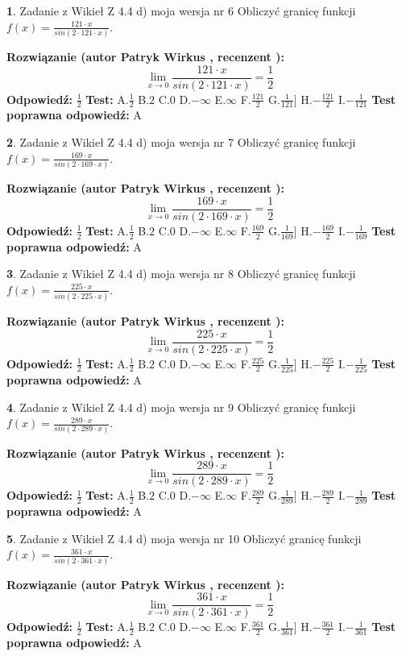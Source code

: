 \documentclass[12pt, a4paper]{article}
\theoremstyle{definition} %
\newtheorem{zad}{}
\newcommand{\zadStart}[1]{\begin{zad}#1\newline}
\newcommand{\zadStop}{\end{zad}}
\newcommand{\rozwStart}[2]{\noindent \textbf{Rozwiązanie (autor #1 , recenzent #2): }\newline}
\newcommand{\rozwStop}{\newline}
\newcommand{\odpStart}{\noindent \textbf{Odpowiedź:}\newline}
\newcommand{\odpStop}{\newline}
\newcommand{\testStart}{\noindent \textbf{Test:}\newline}
\newcommand{\testStop}{\newline}
\newcommand{\kluczStart}{\noindent \textbf{Test poprawna odpowiedź:}\newline}
\newcommand{\kluczStop}{\newline}
\begin{document}
\zadStart{Zadanie z Wikieł Z 4.4 d) moja wersja nr 6}
Obliczyć granicę funkcji $f(x)=\frac{121\cdot x}{sin(2 \cdot121\cdot x)}$.
\zadStop
\rozwStart{Patryk Wirkus}{}
$$\lim\limits_{x\to 0}\frac{121\cdot x}{sin(2 \cdot121\cdot x)}=\frac{1}{2}$$
\rozwStop
\odpStart
$\frac{1}{2}$
\odpStop
\testStart
A.$\frac{1}{2}$
B.$2$
C.$0$
D.$-\infty$
E.$\infty$
F.$\frac{121}{2}$
G.$\frac{1}{121}]$
H.$-\frac{121}{2}$
I.$-\frac{1}{121}$
\testStop
\kluczStart
A
\kluczStop



\zadStart{Zadanie z Wikieł Z 4.4 d) moja wersja nr 7}
Obliczyć granicę funkcji $f(x)=\frac{169\cdot x}{sin(2 \cdot169\cdot x)}$.
\zadStop
\rozwStart{Patryk Wirkus}{}
$$\lim\limits_{x\to 0}\frac{169\cdot x}{sin(2 \cdot169\cdot x)}=\frac{1}{2}$$
\rozwStop
\odpStart
$\frac{1}{2}$
\odpStop
\testStart
A.$\frac{1}{2}$
B.$2$
C.$0$
D.$-\infty$
E.$\infty$
F.$\frac{169}{2}$
G.$\frac{1}{169}]$
H.$-\frac{169}{2}$
I.$-\frac{1}{169}$
\testStop
\kluczStart
A
\kluczStop



\zadStart{Zadanie z Wikieł Z 4.4 d) moja wersja nr 8}
Obliczyć granicę funkcji $f(x)=\frac{225\cdot x}{sin(2 \cdot225\cdot x)}$.
\zadStop
\rozwStart{Patryk Wirkus}{}
$$\lim\limits_{x\to 0}\frac{225\cdot x}{sin(2 \cdot225\cdot x)}=\frac{1}{2}$$
\rozwStop
\odpStart
$\frac{1}{2}$
\odpStop
\testStart
A.$\frac{1}{2}$
B.$2$
C.$0$
D.$-\infty$
E.$\infty$
F.$\frac{225}{2}$
G.$\frac{1}{225}]$
H.$-\frac{225}{2}$
I.$-\frac{1}{225}$
\testStop
\kluczStart
A
\kluczStop



\zadStart{Zadanie z Wikieł Z 4.4 d) moja wersja nr 9}
Obliczyć granicę funkcji $f(x)=\frac{289\cdot x}{sin(2 \cdot289\cdot x)}$.
\zadStop
\rozwStart{Patryk Wirkus}{}
$$\lim\limits_{x\to 0}\frac{289\cdot x}{sin(2 \cdot289\cdot x)}=\frac{1}{2}$$
\rozwStop
\odpStart
$\frac{1}{2}$
\odpStop
\testStart
A.$\frac{1}{2}$
B.$2$
C.$0$
D.$-\infty$
E.$\infty$
F.$\frac{289}{2}$
G.$\frac{1}{289}]$
H.$-\frac{289}{2}$
I.$-\frac{1}{289}$
\testStop
\kluczStart
A
\kluczStop



\zadStart{Zadanie z Wikieł Z 4.4 d) moja wersja nr 10}
Obliczyć granicę funkcji $f(x)=\frac{361\cdot x}{sin(2 \cdot361\cdot x)}$.
\zadStop
\rozwStart{Patryk Wirkus}{}
$$\lim\limits_{x\to 0}\frac{361\cdot x}{sin(2 \cdot361\cdot x)}=\frac{1}{2}$$
\rozwStop
\odpStart
$\frac{1}{2}$
\odpStop
\testStart
A.$\frac{1}{2}$
B.$2$
C.$0$
D.$-\infty$
E.$\infty$
F.$\frac{361}{2}$
G.$\frac{1}{361}]$
H.$-\frac{361}{2}$
I.$-\frac{1}{361}$
\testStop
\kluczStart
A
\kluczStop
\end{document}
